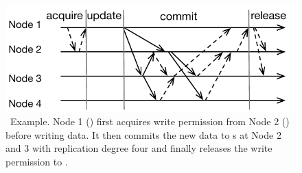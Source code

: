 {
\begin{figure}[th]
\begin{center}
\centerline{\includegraphics[width=\textwidth]{hotpot/Figures/mrsw.pdf}}
\caption[\mrsw\ Example.]
{
\mrsw\ Example.
Node 1 (\xn) first acquires write permission from Node 2 (\master)
before writing data.
It then commits the new data to \on{}s at Node 2 and 3 with replication degree four
and finally releases the write permission to \master.
}
\label{fig-mrsw}
\end{center}
\end{figure}
}
